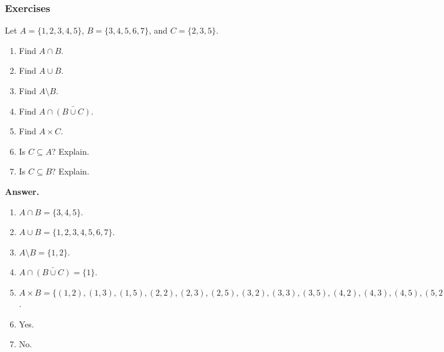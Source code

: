 \documentclass[10pt,]{book}
\theoremstyle{plain}
\theoremstyle{definition}
\theoremstyle{definition}
\theoremstyle{definition}
\begin{document}
\subsubsection[Exercises]{Exercises}\label{exercises-1}
\begin{exerciselist}
\item[1.]\hypertarget{exercise-1}{}
            Let \(A = \{1,2,3,4,5\}\), \(B = \{3,4,5,6,7\}\), and \(C = \{2,3,5\}\).
\leavevmode%
\begin{enumerate}[label=(\alph*)]
\item\hypertarget{li-66}{}
                Find \(A \cap B\).
\item\hypertarget{li-67}{}
                Find \(A \cup B\).
\item\hypertarget{li-68}{}
                Find \(A \setminus B\).
\item\hypertarget{li-69}{}
                Find \(A \cap \bar{(B \cup C)}\).
\item\hypertarget{li-70}{}
                Find \(A \times C\).
\item\hypertarget{li-71}{}
                Is \(C \subseteq A\)? Explain.
\item\hypertarget{li-72}{}
                Is \(C \subseteq B\)? Explain.
\end{enumerate}
\par\smallskip
\par\smallskip
\noindent\textbf{Answer.}\hypertarget{answer-1}{}\quad
\leavevmode%
\begin{enumerate}[label=(\alph*)]
\item\hypertarget{li-73}{}\(A \cap B = \{3,4,5\}\).\item\hypertarget{li-74}{}\(A \cup B = \{1,2,3,4,5,6,7\}\).\item\hypertarget{li-75}{}\(A \setminus B = \{1,2\}\).\item\hypertarget{li-76}{}\(A \cap \bar{(B \cup C)} = \{1\}\).\item\hypertarget{li-77}{}\(A \times B = \{(1,2), (1,3), (1,5), (2,2), (2,3), (2,5), (3,2), (3,3), (3,5), (4,2), (4,3), (4,5), (5,2), (5,3), (5,5)\}\).\item\hypertarget{li-78}{}
                Yes.
\item\hypertarget{li-79}{}
                No.
\end{enumerate}
\item[2.]\hypertarget{exercise-2}{}

\end{exerciselist}
\end{document}
